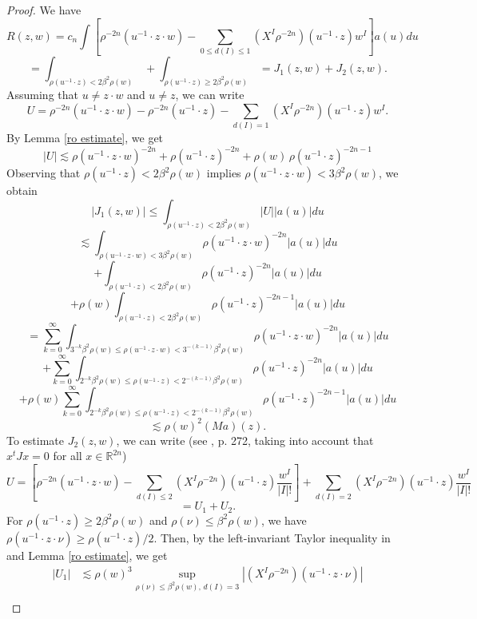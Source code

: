 \documentclass[reqno,10pt]{article}
\theoremstyle{definition}
\numberwithin{equation}{section}
\numberwithin{theorem}{section}
\begin{document}
\begin{proof}
We have
\[
R(z, w) = c_n \int \left[ \rho^{-2n}(u^{-1} \cdot z \cdot w) - \sum_{0 \leq d(I) \leq 1} (X^I \rho^{-2n})(u^{-1} \cdot z) w^{I} \right] 
a(u) du
\]
\[
=\int_{\rho(u^{-1} \cdot z) < 2 \beta^2 \rho(w)} \, + \int_{\rho(u^{-1} \cdot z) \geq 2 \beta^2 \rho(w)} \, = J_1(z, w) + J_2(z, w).
\]
Assuming that $u \neq z \cdot w$ and $u \neq z$, we can write
\[
U = \rho^{-2n}(u^{-1} \cdot z \cdot w) - \rho^{-2n}(u^{-1} \cdot z) - \sum_{d(I) = 1} (X^I \rho^{-2n})(u^{-1} \cdot z) w^{I}.
\]
By Lemma \ref{ro estimate}, we get
\[
|U| \lesssim \rho(u^{-1} \cdot z \cdot w)^{-2n} + \rho(u^{-1} \cdot z)^{-2n} + \rho(w) \, \rho(u^{-1} \cdot z)^{-2n-1}
\]
Observing that $\rho(u^{-1} \cdot z) < 2 \beta^2 \rho(w)$ implies $\rho(u^{-1} \cdot z \cdot w) < 3 \beta^2 \rho(w)$, we obtain
\[
|J_1(z, w)| \leq \int_{\rho(u^{-1} \cdot z) < 2 \beta^2 \rho(w)} |U||a(u)| du
\]
\[
\lesssim  \int_{\rho(u^{-1} \cdot z \cdot w) < 3 \beta^2 \rho(w)} \rho(u^{-1} \cdot z \cdot w)^{-2n} |a(u)| du  
\]
\[
+
\int_{\rho(u^{-1} \cdot z) < 2 \beta^2 \rho(w)} \rho(u^{-1} \cdot z)^{-2n}  |a(u)| du
\]
\[
+ \rho(w) \int_{\rho(u^{-1} \cdot z) < 2 \beta^2 \rho(w)} \rho(u^{-1} \cdot z)^{-2n-1} |a(u)| du
\]
\[
= \sum_{k=0}^{\infty}\int_{3^{-k}\beta^2\rho(w) \leq \rho(u^{-1} \cdot z \cdot w) <3^{-(k-1)}\beta^2 \rho(w)} 
\rho(u^{-1} \cdot z \cdot w)^{-2n} |a(u)| du
\]
\[
+
\sum_{k=0}^{\infty} \int_{2^{-k}\beta^2 \rho(w) \leq \rho(u^{-1} \cdot z) < 2^{-(k-1)}\beta^2 \rho(w)} \rho(u^{-1} \cdot z)^{-2n}  |a(u)| du
\]
\[
+ \rho(w) \sum_{k=0}^{\infty} \int_{2^{-k} \beta^2 \rho(w) \leq \rho(u^{-1} \cdot z) < 2^{-(k-1)} \beta^2 \rho(w)} 
\rho(u^{-1} \cdot z)^{-2n-1} |a(u)| du
\]
\[
\lesssim \rho(w)^2 (Ma)(z).
\]
To estimate $J_2(z, w)$, we can write (see \cite{Bonfi}, p. 272, taking into account that $x^t J x = 0$ for all $x \in \mathbb{R}^{2n}$)
\[
U= \left[\rho^{-2n}(u^{-1} \cdot z \cdot w) - \sum_{d(I) \leq 2} (X^I \rho^{-2n})(u^{-1} \cdot z) \frac{w^{I}}{|I|!} \right] + 
\sum_{d(I) = 2} (X^I \rho^{-2n})(u^{-1} \cdot z) \frac{w^{I}}{|I|!}
\]
\[
=U_1+U_2.
\]
For $\rho(u^{-1} \cdot z) \geq 2 \beta^2 \rho(w)$ and $\rho(\nu) \leq \beta^2 \rho(w)$, we have  
$\rho(u^{-1} \cdot z \cdot \nu) \geq \rho(u^{-1} \cdot z)/2$. Then, by the left-invariant Taylor inequality in \cite[Corollary 1.44]{Foll-St} and Lemma \ref{ro estimate}, we get
\begin{equation*}
\begin{split}
|U_1| & \lesssim \rho(w)^3 \sup_{\rho(\nu) \leq \beta^{2}\rho(w), \, d(I)=3} \left|(X^{I} \rho^{-2n})( u^{-1} \cdot z \cdot \nu) \right| \\

\end{split}
\end{equation*}
\end{proof}
\end{document}
